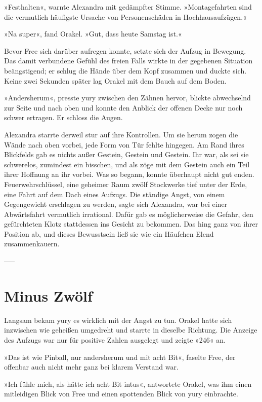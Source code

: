 »Festhalten«, warnte Alexandra mit gedämpfter Stimme. »Montagefahrten sind die vermutlich häufigste Ursache von Personenschäden in Hochhausaufzügen.«

»Na super«, fand Orakel. »Gut, dass heute Samstag ist.«

Bevor Free sich darüber aufregen konnte, setzte sich der Aufzug in Bewegung. Das damit verbundene Gefühl des freien Falls wirkte in der gegebenen Situation beängstigend; er schlug die Hände über dem Kopf zusammen und duckte sich. Keine zwei Sekunden später lag Orakel mit dem Bauch auf dem Boden.

»Andersherum«, presste yury zwischen den Zähnen hervor, blickte abwechselnd zur Seite und nach oben und konnte den Anblick der offenen Decke nur noch schwer ertragen. Er schloss die Augen.

Alexandra starrte derweil stur auf ihre Kontrollen. Um sie herum zogen die Wände nach oben vorbei, jede Form von Tür fehlte hingegen. Am Rand ihres Blickfelds gab es nichts außer Gestein, Gestein und Gestein. Ihr war, als sei sie schwerelos, zumindest ein bisschen, und als zöge mit dem Gestein auch ein Teil ihrer Hoffnung an ihr vorbei. Was so begann, konnte überhaupt nicht gut enden. Feuerwehrschlüssel, eine geheimer Raum zwölf Stockwerke tief unter der Erde, eine Fahrt auf dem Dach eines Aufzugs. Die ständige Angst, von einem Gegengewicht erschlagen zu werden, sagte sich Alexandra, war bei einer Abwärtsfahrt vermutlich irrational. Dafür gab es möglicherweise die Gefahr, den gefürchteten Klotz stattdessen ins Gesicht zu bekommen. Das hing ganz von ihrer Position ab, und dieses Bewusstsein ließ sie wie ein Häufchen Elend zusammenkauern.

-----

\chapter{Minus Zwölf}

Langsam bekam yury es wirklich mit der Angst zu tun. Orakel hatte sich inzwischen wie geheißen umgedreht und starrte in dieselbe Richtung. Die Anzeige des Aufzugs war nur für positive Zahlen ausgelegt und zeigte »246« an.

»Das ist wie Pinball, nur andersherum und mit acht Bit«, faselte Free, der offenbar auch nicht mehr ganz bei klarem Verstand war.

»Ich fühle mich, als hätte ich acht Bit intus«, antwortete Orakel, was ihm einen mitleidigen Blick von Free und einen spottenden Blick von yury einbrachte.

